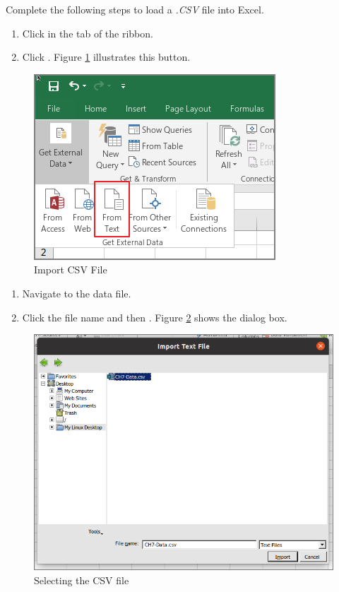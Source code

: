 Complete the following steps to load a \textit{.CSV} file into Excel.

\begin{enumerate}
	\item Click  in the  tab of the ribbon.
	\item Click . Figure \ref{07:fig06} illustrates this button.
\end{enumerate}

\begin{figure}[H]
	\centering
	\includegraphics[width=\maxwidth{.95\linewidth}]{gfx/ch07_fig06}
	\caption{Import CSV File}
	\label{07:fig06}
\end{figure}

\begin{enumerate}
	\item Navigate to the data file.
	\item Click the file name and then . Figure \ref{07:fig07} shows the  dialog box.
\end{enumerate}

\begin{figure}[H]
	\centering
	\includegraphics[width=\maxwidth{.95\linewidth}]{gfx/ch07_fig07}
	\caption{Selecting the CSV file}
	\label{07:fig07}
\end{figure}

